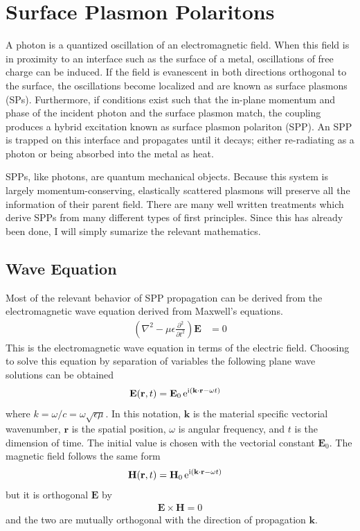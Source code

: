 \documentclass[a4paper,titlepage,onecolumn]{report}
\begin{document}
\section{Surface Plasmon Polaritons}
A photon is a quantized oscillation of an electromagnetic field.  When this
field is in proximity to an interface such as the surface of a metal,
oscillations of free charge can be induced.  If the field is evanescent in
both directions orthogonal to the surface, the oscillations become
localized and are known as surface plasmons (SPs).  Furthermore, if
conditions exist such that the in-plane momentum and phase of the incident
photon and the surface plasmon match, the coupling produces a hybrid
excitation known as surface plasmon polariton (SPP).  An SPP is trapped on
this interface and propagates until it decays; either re-radiating as a
photon or being absorbed into the metal as heat.

SPPs, like photons, are quantum mechanical objects.  Because this system is
largely momentum-conserving, elastically scattered plasmons will preserve
all the information of their parent field.  There are many well written
treatments which derive SPPs from many different types of first principles.
Since this has already been done, I will simply sumarize the relevant
mathematics.

\subsection{Wave Equation}
Most of the relevant behavior of SPP propagation can be derived from the
electromagnetic wave equation derived from Maxwell's equations.
\begin{align}
\left(\nabla^2-\mu\epsilon\frac{\partial^2}{\partial t^2}\right)\mathbf{E}&=0
\label{eqn:ewe}
\end{align}
This is the electromagnetic wave equation in terms of the electric field.
Choosing to solve this equation by separation of variables the following
plane wave solutions can be obtained
\begin{align}
 \mathbf{E} ( \mathbf{r}, t ) &= \mathbf{E}_0\, {\mathrm{e}}^{{\mathrm{i}} (\mathbf{k} \cdot \mathbf{r} - \omega t )}
\label{eqn:planewaves}
\end{align}
where $k=\omega/c=\omega\sqrt{\epsilon\mu}$.  In this notation,
$\mathbf{k}$ is the material specific vectorial wavenumber, $\mathbf{r}$ is the
spatial position, $\omega$ is angular frequency, and $t$ is
the dimension of time.
The initial value is chosen with the vectorial constant $\mathbf{E}_0$.
The magnetic field follows the same form
\begin{align}
 \mathbf{H} ( \mathbf{r}, t ) &= \mathbf{H}_0\, {\mathrm{e}}^{{\mathrm{i}} (\mathbf{k}
 \cdot \mathbf{r} - \omega t )}
\end{align} 
but it is orthogonal $\mathbf{E}$ by
\begin{align}
\mathbf{E} \times \mathbf{H} = 0
\end{align}
and the two are mutually orthogonal with the direction of propagation
$\mathbf{k}$.
\end{document}
